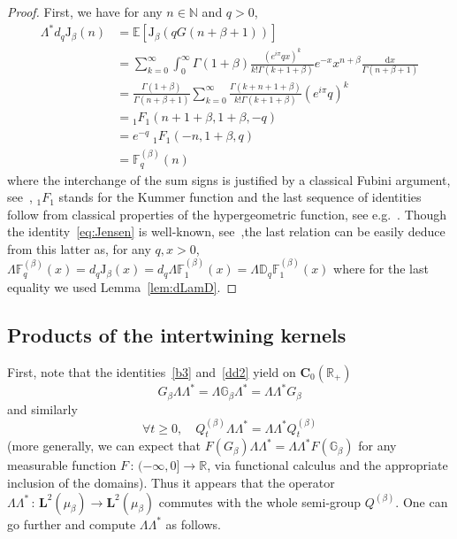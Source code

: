 \documentclass[AHL,Unicode,longabstracts]{cedram}
\newcommand{\RR}{\mathbb{R}}
\newcommand{\iy}{\infty}
\newcommand{\ri}{\rightarrow}
\newcommand{\st}{\,:\,}
\newcommand{\dBg}{{\discret{G}}}
\newcommand{\Bg}{G}
\newcommand{\Bs}{Q}
\newcommand{\esL}{\mathbf{L}}
\newcommand{\esC}{\mathbf{C}}
\newcommand{\Jg}{{\mathrm{J}}_{\beta}}
\newcommand*\E{{\mathbb E}}
\newcommand*\N{{\mathbb N}}
\newcommand{\discret}[1]{\mathds{#1}}
\newcommand{\cont}[1]{{#1}}
\newcommand{\adjL}{\Lambda^*}
\newcommand*{\MK}{\mkern 2mu}
\let\oldforall\forall
\renewcommand*{\forall}{\mathrel{\oldforall}}
\newcommand*{\dd}{\mathrm{d}}
\newcommand*{\dx}{\dd x}
\begin{document}
\begin{proof}
First, we have for any $n\in \N$ and $q>0$,
\begin{align*}
\Lambda^* d_q \Jg(n) &= \E\left[\Jg(q G(n+\beta+1))\right]\\&=
\sum_{k=0}^{\infty}\int_0^{\infty}\Gamma(1+\beta)\frac{(e^{i\pi}qx)^k}{k!\Gamma(k+1+\beta)}e^{-x}x^{n+\beta}\frac{\dx}{\Gamma(n+\beta+1)}\\
&=\frac{\Gamma(1+\beta)}{\Gamma(n+\beta+1)} \sum_{k=0}^{\infty}\frac{\Gamma(k+n+1+\beta)}{k!\Gamma(k+1+\beta)}(e^{i\pi}q)^k \\
&= {}_{1}F_{1}(n+1+\beta,1+\beta,-q)\\
&= e^{-q}\; {}_{1}F_{1}(-n,1+\beta,q)\\
&= \mathbb{F}^{(\beta)}_q(n)
\end{align*}
where the interchange of the sum signs is justified by a classical Fubini argument, see~\cite{Titchmarsh39}, $ {}_{1}F_{1}$ stands for the Kummer function and the last sequence of identities follow from classical properties of the hypergeometric function, see e.g.~\cite{Koekoek2010}. Though the identity~\eqref{eq:Jensen} is well-known, see~\cite[Proposition~2.1$\MK$(ii)]{Craven1989},\linebreak the last relation can be easily deduce from this latter as, for any $q,x>0$, \linebreak$\Lambda \mathbb{F}^{(\beta)}_q(x)=\cont{d}_q\Jg(x)=\cont{d}_q\Lambda \mathbb{F}^{(\beta)}_1(x)=\Lambda \discret{D}_q\mathbb{F}^{(\beta)}_1(x)$ where for the last equality we used Lemma~\ref{lem:dLamD}.
\end{proof}

\subsection{Products of the intertwining kernels}

First, note that the identities~\eqref{b3} and~\eqref{dd2} yield on $\esC_0(\RR_+)$
\[
\Bg_{\beta}\Lambda\adjL =\Lambda \dBg_{\beta} \adjL =\Lambda\adjL \Bg_{\beta}
\]
and similarly
\[
\forall t\geq 0,\quad
\Bs^{(\beta)}_t\Lambda\adjL =\Lambda\adjL \Bs_t^{(\beta)}
\]
(more generally, we can expect that $F(\Bg_{\beta})\Lambda\adjL =\Lambda\adjL F(\dBg_{\beta})$ for any measurable function $F\st (-\iy,0]\ri\RR$, via functional calculus and the appropriate inclusion of the domains). Thus it appears that the operator $\Lambda\adjL \st \esL^2(\mu_{\beta})\ri\esL^2(\mu_{\beta})$ commutes with the whole semi-group $\Bs^{(\beta)}$. One can go further and compute $\Lambda\adjL $ as follows.
\end{document}
